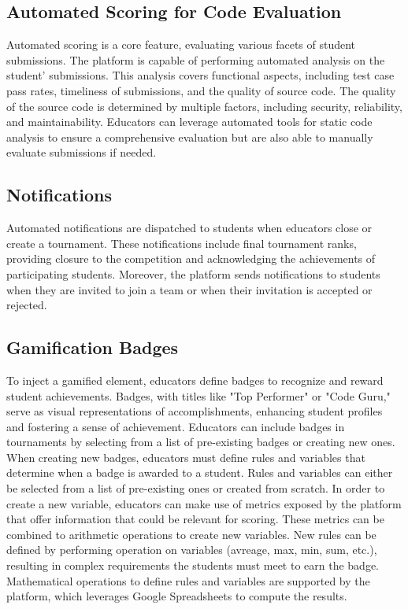 \subsection*{Automated Scoring for Code Evaluation}
Automated scoring is a core feature, evaluating various facets of student submissions. 
The platform is capable of performing automated analysis on the student' submissions.
This analysis covers functional aspects, including test case pass rates, timeliness of submissions, and the quality of source code.
The quality of the source code is determined by multiple factors, including security, reliability, and maintainability.
Educators can leverage automated tools for static code analysis to ensure a comprehensive evaluation but are also able to manually evaluate submissions if needed.

\subsection*{Notifications}
Automated notifications are dispatched to students when educators close or create a tournament. 
These notifications include final tournament ranks, providing closure to the competition and acknowledging the achievements of participating students.
Moreover, the platform sends notifications to students when they are invited to join a team or when their invitation is accepted or rejected.

\subsection*{Gamification Badges}
To inject a gamified element, educators define badges to recognize and reward student achievements. 
Badges, with titles like "Top Performer" or "Code Guru," serve as visual representations of accomplishments, enhancing student profiles and fostering a sense of achievement.
Educators can include badges in tournaments by selecting from a list of pre-existing badges or creating new ones.
When creating new badges, educators must define rules and variables that determine when a badge is awarded to a student.
Rules and variables can either be selected from a list of pre-existing ones or created from scratch.
In order to create a new variable, educators can make use of metrics exposed by the platform that offer information that could be relevant for scoring. 
These metrics can be combined to arithmetic operations to create new variables.
New rules can be defined by performing operation on variables (avreage, max, min, sum, etc.), resulting in complex requirements the students must meet to earn the badge.
Mathematical operations to define rules and variables are supported by the platform, which leverages Google Spreadsheets to compute the results.


